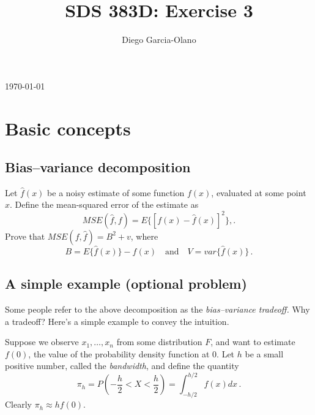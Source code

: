 \documentclass{homework}
\title{SDS 383D: Exercise 3}
\author{Diego Garcia-Olano}
\begin{document}
\makeatletter
\begin{titlepage}
	\vspace*{\fill}
	\centering
	{\huge \@title \par}
	\vskip0.5cm
	{\large \@author \par}
	\vskip0.5cm
	{\large \today \par}
	\vspace*{\fill}
\end{titlepage}
\makeatother

\newpage 
\mbox{}
\thispagestyle{empty}

\setcounter{page}{1}


\section{Basic concepts}

\subsection{Bias--variance decomposition}

Let $\hat{f}(x)$ be a noisy estimate of some function $f(x)$, evaluated at some point $x$.  Define the mean-squared error of the estimate as
$$
MSE(\hat{f}, f) = E\{ [ f(x) - \hat{f}(x)]^2 \} , .
$$
Prove that $MSE(f, \hat{f}) = B^2 + v$, where
$$
B = E \{ \hat{f}(x) \} - f(x) \quad \mbox{and} \quad V = var\{ \hat{f}(x) \} \, .
$$

\subsection{A simple example  (optional problem)}

Some people refer to the above decomposition as the \textit{bias--variance tradeoff.}  Why a tradeoff?  Here's a simple example to convey the intuition.

Suppose we observe $x_1, \ldots, x_n$ from some distribution $F$, and want to estimate $f(0)$, the value of the probability density function at 0.  Let $h$ be a small positive number, called the \textit{bandwidth}, and define the quantity
$$
\pi_h = P\left( -\frac{h}{2} < X < \frac{h}{2} \right) = \int_{-h/2}^{h/2} f(x) dx \, .
$$
Clearly $\pi_h \approx h f(0)$.
\end{document}
